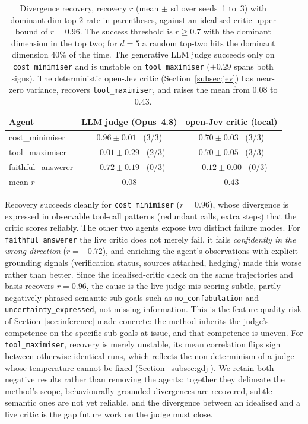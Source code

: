 \begin{table}[h]
\centering
\small
\begin{tabular}{@{}lcc@{}}
\toprule
Agent & LLM judge (Opus~4.8) & open-Jev critic (local) \\
\midrule
cost\_minimiser & $0.96 \pm 0.01$ \ (3/3) & $0.70 \pm 0.03$ \ (3/3) \\
tool\_maximiser & $-0.01 \pm 0.29$ \ (2/3) & $0.70 \pm 0.05$ \ (3/3) \\
faithful\_answerer & $-0.72 \pm 0.19$ \ (0/3) & $-0.12 \pm 0.00$ \ (0/3) \\
\midrule
mean $r$ & $0.08$ & $0.43$ \\
\bottomrule
\end{tabular}
\caption{Divergence recovery, recovery $r$ (mean $\pm$ sd over seeds~1 to~3) with
dominant-dim top-2 rate in parentheses, against an idealised-critic upper bound of
$r = 0.96$. The success threshold is $r \geq 0.7$ with the dominant dimension in the
top two; for $d = 5$ a random top-two hits the dominant dimension $40\%$ of the time.
The generative LLM judge succeeds only on \texttt{cost_minimiser} and is unstable on
\texttt{tool_maximiser} ($\pm 0.29$ spans both signs). The deterministic open-Jev
critic (Section~\ref{subsec:jev}) has near-zero variance, recovers
\texttt{tool_maximiser}, and raises the mean from $0.08$ to $0.43$.}
\label{tab:recovery}
\end{table}

Recovery succeeds cleanly for \texttt{cost_minimiser} ($r = 0.96$), whose divergence
is expressed in observable tool-call patterns (redundant calls, extra steps) that the
critic scores reliably. The other two agents expose two distinct failure modes. For
\texttt{faithful_answerer} the live critic does not merely fail, it fails
\emph{confidently in the wrong direction} ($r = -0.72$), and enriching the agent's
observations with explicit grounding signals (verification status, sources attached,
hedging) made this worse rather than better. Since the idealised-critic check on the
same trajectories and basis recovers $r = 0.96$, the cause is the live judge
mis-scoring subtle, partly negatively-phrased semantic sub-goals such as
\texttt{no_confabulation} and \texttt{uncertainty_expressed}, not missing information.
This is the feature-quality risk of Section~\ref{sec:inference} made concrete: the
method inherits the judge's competence on the specific sub-goals at issue, and that
competence is uneven. For \texttt{tool_maximiser}, recovery is merely unstable, its
mean correlation flips sign between otherwise identical runs, which reflects the
non-determinism of a judge whose temperature cannot be fixed
(Section~\ref{subsec:gdj}). We retain both negative results rather than removing the
agents: together they delineate the method's scope, behaviourally grounded divergences
are recovered, subtle semantic ones are not yet reliable, and the divergence between an
idealised and a live critic is the gap future work on the judge must close.

